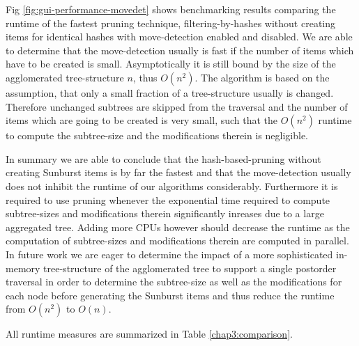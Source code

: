 Fig \ref{fig:gui-performance-movedet} shows benchmarking results comparing the runtime of the fastest pruning technique, filtering-by-hashes without creating items for identical hashes with move-detection enabled and disabled. We are able to determine that the move-detection usually is fast if the number of items which have to be created is small. Asymptotically it is still bound by the size of the agglomerated tree-structure $n$, thus $O(n^2)$. The algorithm is based on the assumption, that only a small fraction of a tree-structure usually is changed. Therefore unchanged subtrees are skipped from the traversal and the number of items which are going to be created is very small, such that the $O(n^2)$ runtime to compute the subtree-size and the modifications therein is negligible.

In summary we are able to conclude that the hash-based-pruning without creating Sunburst items is by far the fastest and that the move-detection usually does not inhibit the runtime of our algorithms considerably. Furthermore it is required to use pruning whenever the exponential time required to compute subtree-sizes and modifications therein significantly inreases due to a large aggregated tree. Adding more CPUs however should decrease the runtime as the computation of subtree-sizes and modifications therein are computed in parallel. In future work we are eager to determine the impact of a more sophisticated in-memory tree-structure of the agglomerated tree to support a single postorder traversal in order to determine the subtree-size as well as the modifications for each node before generating the Sunburst items and thus reduce the runtime from $O(n^2)$ to $O(n)$.

All runtime measures are summarized in Table \ref{chap3:comparison}.

